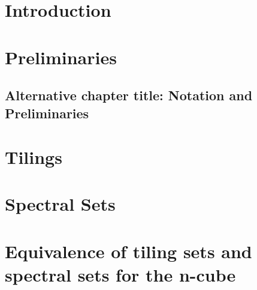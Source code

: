 \documentclass[british, oneside]{ntnuthesis}
\begin{document}
    



    \chapter{Introduction}
        

    \chapter{Preliminaries}
    \section*{Alternative chapter title: Notation and Preliminaries}
        
    
    \chapter{Tilings}
        

    \chapter{Spectral Sets}
        
    
    \chapter{Equivalence of tiling sets and spectral sets for the n-cube}\label{chap:equivalence}
        


    \printbibliography
\end{document}
